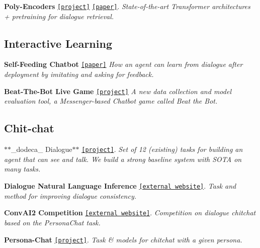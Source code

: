 \begin{DoxyItemize}
\item {\bfseries Poly-\/\+Encoders} \href{https://parl.ai/projects/polyencoder/}{\tt \mbox{[}project\mbox{]}} \href{https://arxiv.org/abs/1905.01969}{\tt \mbox{[}paper\mbox{]}}. {\itshape State-\/of-\/the-\/art Transformer architectures + pretraining for dialogue retrieval.}
\end{DoxyItemize}

\subsection*{Interactive Learning}


\begin{DoxyItemize}
\item {\bfseries Self-\/\+Feeding Chatbot} \href{https://arxiv.org/abs/1901.05415}{\tt \mbox{[}paper\mbox{]}} {\itshape How an agent can learn from dialogue after deployment by imitating and asking for feedback.}
\item {\bfseries Beat-\/\+The-\/\+Bot Live Game} \href{https://parl.ai/projects/beat_the_bot/}{\tt \mbox{[}project\mbox{]}} {\itshape A new data collection and model evaluation tool, a Messenger-\/based Chatbot game called Beat the Bot.}
\end{DoxyItemize}

\subsection*{Chit-\/chat}


\begin{DoxyItemize}
\item $\ast$$\ast$\+\_\+dodeca\+\_\+ Dialogue$\ast$$\ast$ \href{https://parl.ai/projects/dodecadialogue/}{\tt \mbox{[}project\mbox{]}}. {\itshape Set of 12 (existing) tasks for building an agent that can see and talk. We build a strong baseline system with S\+O\+TA on many tasks.}
\item {\bfseries Dialogue Natural Language Inference} \href{https://wellecks.github.io/dialogue_nli/}{\tt \mbox{[}external website\mbox{]}}. {\itshape Task and method for improving dialogue consistency.}
\item {\bfseries Conv\+A\+I2 Competition} \href{http://convai.io/}{\tt \mbox{[}external website\mbox{]}}. {\itshape Competition on dialogue chitchat based on the Persona\+Chat task.}
\item {\bfseries Persona-\/\+Chat} \href{https://github.com/facebookresearch/ParlAI/tree/master/projects/personachat}{\tt \mbox{[}project\mbox{]}}. {\itshape Task \& models for chitchat with a given persona.}
\end{DoxyItemize}

